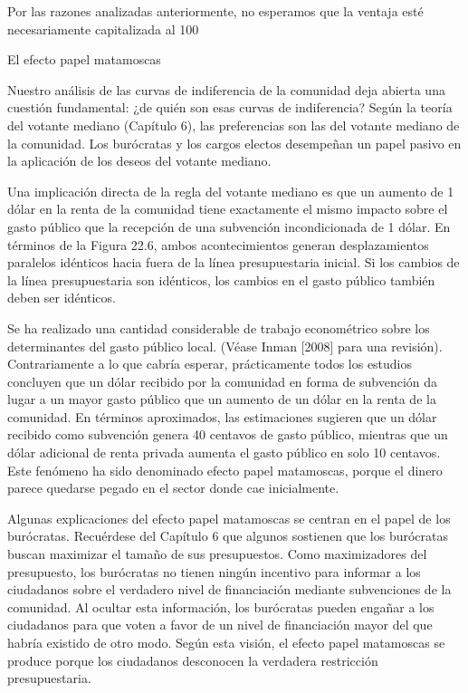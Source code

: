 \documentclass[10pt,a4paper]{article}
\begin{document}
Por las razones analizadas anteriormente, no esperamos que la ventaja esté necesariamente capitalizada al 100 %

El efecto papel matamoscas

Nuestro análisis de las curvas de indiferencia de la comunidad deja abierta una cuestión fundamental: ¿de quién son esas curvas de indiferencia? Según la teoría del votante mediano (Capítulo 6), las preferencias son las del votante mediano de la comunidad. Los burócratas y los cargos electos desempeñan un papel pasivo en la aplicación de los deseos del votante mediano.

Una implicación directa de la regla del votante mediano es que un aumento de 1 dólar en la renta de la comunidad tiene exactamente el mismo impacto sobre el gasto público que la recepción de una subvención incondicionada de 1 dólar. En términos de la Figura 22.6, ambos acontecimientos generan desplazamientos paralelos idénticos hacia fuera de la línea presupuestaria inicial. Si los cambios de la línea presupuestaria son idénticos, los cambios en el gasto público también deben ser idénticos.

Se ha realizado una cantidad considerable de trabajo econométrico sobre los determinantes del gasto público local. (Véase Inman [2008] para una revisión). Contrariamente a lo que cabría esperar, prácticamente todos los estudios concluyen que un dólar recibido por la comunidad en forma de subvención da lugar a un mayor gasto público que un aumento de un dólar en la renta de la comunidad. En términos aproximados, las estimaciones sugieren que un dólar recibido como subvención genera 40 centavos de gasto público, mientras que un dólar adicional de renta privada aumenta el gasto público en solo 10 centavos. Este fenómeno ha sido denominado efecto papel matamoscas, porque el dinero parece quedarse pegado en el sector donde cae inicialmente.

Algunas explicaciones del efecto papel matamoscas se centran en el papel de los burócratas. Recuérdese del Capítulo 6 que algunos sostienen que los burócratas buscan maximizar el tamaño de sus presupuestos. Como maximizadores del presupuesto, los burócratas no tienen ningún incentivo para informar a los ciudadanos sobre el verdadero nivel de financiación mediante subvenciones de la comunidad. Al ocultar esta información, los burócratas pueden engañar a los ciudadanos para que voten a favor de un nivel de financiación mayor del que habría existido de otro modo. Según esta visión, el efecto papel matamoscas se produce porque los ciudadanos desconocen la verdadera restricción presupuestaria.
\end{document}
